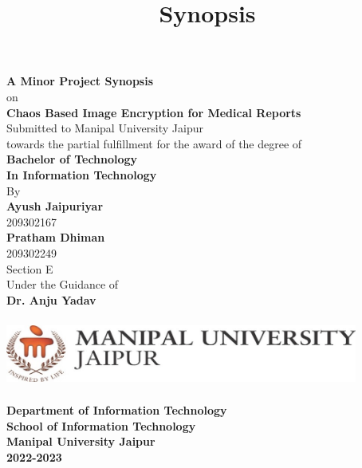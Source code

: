 \documentclass[11pt,a4paper,english]{article}
\begin{document}
\title{Synopsis}
\begin{titlepage}
    \begin{center}
        \LARGE
        \textbf{A Minor Project Synopsis}\\
        on\\
        \Huge
        \textbf{Chaos Based Image Encryption for Medical Reports}\\
        \vspace{0.5cm}
        \Large
        Submitted to Manipal University Jaipur\\
        towards the partial fulfillment for the award of the degree of\\
        \vspace{0.5cm}
        \LARGE
        \textbf{Bachelor of Technology}\\
        \textbf{In Information Technology}\\
        \vspace{0.5cm}
        \large
        By\\
        \Large
        \textbf{Ayush Jaipuriyar}\\
        209302167\\
        \textbf{Pratham Dhiman}\\
        209302249\\
        Section E\\
        \vspace{0.5cm}
        \large
        Under the Guidance of\\
        \Large
        \textbf{Dr. Anju Yadav }

        \vfill

        \includegraphics[width=11.58cm,height=2.28cm]{./logo}

        \LARGE
        \textbf{Department of Information Technology}\\
        \textbf{School of Information Technology }\\
        \textbf{Manipal University Jaipur}\\
        \Large
        \textbf{2022-2023}

    \end{center}
\end{titlepage}
\newpage
\date{}
\title{}
\maketitle
\tableofcontents
\newpage
\end{document}
